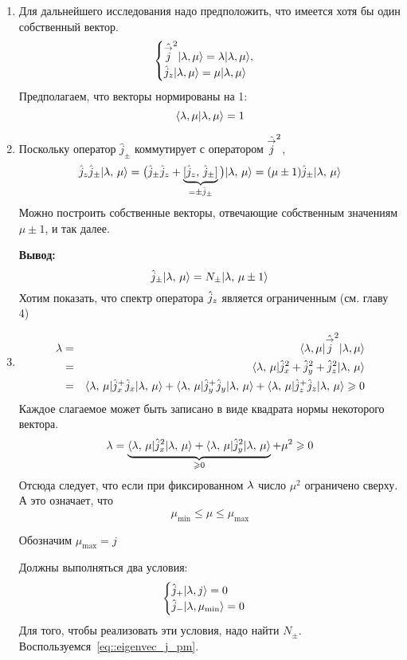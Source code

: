 \begin{enumerate}
  \item Для дальнейшего исследования надо предположить, что имеется хотя бы один собственный вектор.
$$
    \begin{cases}
        \hat{\overset{\to}{j}}^2 | \lambda, \mu \rangle = \lambda | \lambda, \mu \rangle,\\
        \Hat j_z | \lambda, \mu \rangle = \mu | \lambda, \mu \rangle
    \end{cases}
$$
Предполагаем, что векторы нормированы на 1:
$$
    \langle \lambda, \mu | \lambda, \mu \rangle = 1
$$

  \item \begingroup %
\def \jpm {{\hat j}_\pm}
\def \jx {\Hat j_x}
\def \jy {\Hat j_y}
\def \jz {\Hat j_z}
\def \jsq {{\hvec j}^2}
\def \qlm {\qu{\lam,\,\mu}}
Поскольку оператор $\jpm$ коммутирует с оператором $\jsq$,
$$
    \jz \jpm \qlm = \big( \jpm \jz + \underbrace{[\jz,\, \jpm]}_{= \pm \jpm} \big) \qlm = (\mu \pm 1) \jpm \qlm
$$
Можно построить собственные векторы, отвечающие собственным значениям $\mu \pm 1$, и так далее.

\textbf{Вывод:}
\begin{equation}
    \jpm \qlm = N_\pm \qu{\lam, \, \mu \pm 1}
    \label{eq::eigenvec_j_pm}
\end{equation}
Хотим показать, что спектр оператора $\jz$ является ограниченным (см. главу 4)

  \item %
\def \lmu {\lam, \, \mu}
\begin{eqnarray*}
    \lam &=& \qtri{\lam,\mu}{\jsq}{\lam,\mu} \\
    &=& \qtri{\lmu}{\Hat j_x^2 + \Hat j_y^2 + \Hat j_z^2}{\lmu}\\
    &=& \qtri{\lmu}{\jx^+ \jx}{\lmu} + \qtri{\lmu}{\jy^+ \jy}{\lmu} + \qtri{\lmu}{\jz^+ \jz}{\lmu} \geqslant 0
\end{eqnarray*}
Каждое слагаемое может быть записано в виде квадрата нормы некоторого вектора.
$$
    \lam = \underbrace{\qtri{\lmu}{\jx^2}{\lmu} + \qtri{\lmu}{\jy^2}{\lmu}}_{\geqslant 0} + \mu^2 \geqslant 0
$$
Отсюда следует, что если при фиксированном $\lambda$ число $\mu^2$ ограничено сверху.
А это означает, что
$$
    \mu_{\min} \leqslant \mu \leqslant \mu_{\max}
$$
\begin{center}
Обозначим $\mu_{\max} = j$
\end{center}
Должны выполняться два условия:
\def \jp {\Hat j_+}
\def \jm {\Hat j_-}
$$
    \begin{cases}
        \jp \qu{\lam, j} = 0\\
        \jm \qu{\lam, \mu_{\min}} = 0
    \end{cases}
$$
Для того, чтобы реализовать эти условия, надо найти $N_\pm$. Воспользуемся~\eqref{eq::eigenvec_j_pm}.


\end{enumerate}
